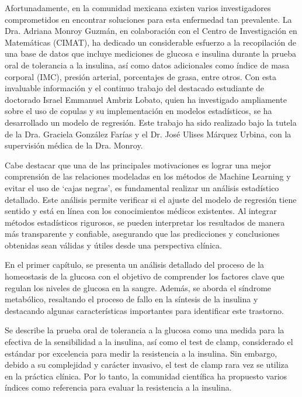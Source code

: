 Afortunadamente, en la comunidad mexicana existen varios investigadores comprometidos en encontrar soluciones para esta enfermedad tan prevalente. La Dra. Adriana Monroy Guzmán, en colaboración con el Centro de Investigación en Matemáticas (CIMAT), ha dedicado un considerable esfuerzo a la recopilación de una base de datos que incluye mediciones de glucosa e insulina durante la prueba oral de tolerancia a la insulina, así como datos adicionales como índice de masa corporal (IMC), presión arterial, porcentajes de grasa, entre otros. Con esta invaluable información y el continuo trabajo del destacado estudiante de doctorado Israel Emmanuel Ambriz Lobato, quien ha investigado ampliamente sobre el uso de copulas y su implementación en modelos estadísticos, se ha desarrollado un modelo de regresión. Este trabajo ha sido realizado bajo la tutela de la Dra. Graciela González Farías y el Dr. José Ulises Márquez Urbina, con la supervisión médica de la Dra. Monroy.

Cabe destacar que una de las principales motivaciones es lograr una mejor comprensión de las relaciones modeladas en los métodos de Machine Learning y evitar el uso de `cajas negras', es fundamental realizar un análisis estadístico detallado. Este análisis permite verificar si el ajuste del modelo de regresión tiene sentido y está en línea con los conocimientos médicos existentes. Al integrar métodos estadísticos rigurosos, se pueden interpretar los resultados de manera más transparente y confiable, asegurando que las predicciones y conclusiones obtenidas sean válidas y útiles desde una perspectiva clínica.

En el primer capítulo, se presenta un análisis detallado del proceso de la homeostasis de la glucosa con el objetivo de comprender los factores clave que regulan los niveles de glucosa en la sangre. Además, se aborda el síndrome metabólico, resaltando el proceso de fallo en la síntesis de la insulina y destacando algunas características importantes para identificar este trastorno.

Se describe la prueba oral de tolerancia a la glucosa como una medida para la efectiva de la sensibilidad a la insulina, así como el test de clamp, considerado el estándar por excelencia para medir la resistencia a la insulina. Sin embargo, debido a su complejidad y carácter invasivo, el test de clamp rara vez se utiliza en la práctica clínica. Por lo tanto, la comunidad científica ha propuesto varios índices como referencia para evaluar la resistencia a la insulina.

